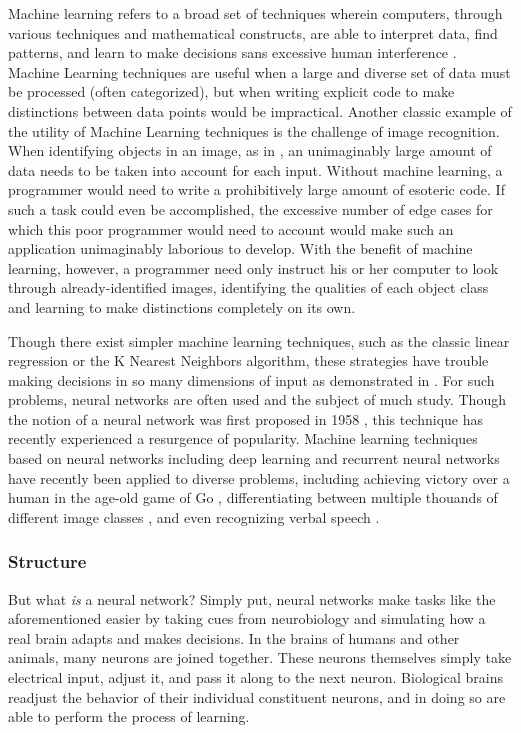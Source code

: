 \documentclass{article}
\begin{document}
Machine learning refers to a broad set of techniques wherein computers, through various techniques and mathematical constructs, are able to interpret data, find patterns, and learn to make decisions sans excessive human interference \cite{sasml}. Machine Learning techniques are useful when a large and diverse set of data must be processed (often categorized), but when writing explicit code to make distinctions between data points would be impractical. Another classic example of the utility of Machine Learning techniques is the challenge of image recognition. When identifying objects in an image, as in \cite{hinton12}, an unimaginably large amount of data needs to be taken into account for each input. Without machine learning, a programmer would need to write a prohibitively large amount of esoteric code. If such a task could even be accomplished, the excessive number of edge cases for which this poor programmer would need to account would make such an application unimaginably laborious to develop. With the benefit of machine learning, however, a programmer need only instruct his or her computer to look through already-identified images, identifying the qualities of each object class and learning to make distinctions completely on its own.

Though there exist simpler machine learning techniques, such as the classic linear regression or the K Nearest Neighbors algorithm, these strategies have trouble making decisions in so many dimensions of input as demonstrated in \cite{knnic}. For such problems, neural networks are often used and the subject of much study. Though the notion of a neural network was first proposed in 1958 \cite{rosenblatt58}, this technique has recently experienced a resurgence of popularity. Machine learning techniques based on neural networks including deep learning \cite{mitdeeplearning} and recurrent neural networks \cite{recurrentsurvey} have recently been applied to diverse problems, including achieving victory over a human in the age-old game of Go \cite{go1}\cite{go2}, differentiating between multiple thouands of different image classes \cite{hinton12}, and even recognizing verbal speech \cite{rnnspoken}.

\subsubsection{Structure}
But what \textit{is} a neural network? Simply put, neural networks make tasks like the aforementioned easier by taking cues from neurobiology and simulating how a real brain adapts and makes decisions. In the brains of humans and other animals, many neurons are joined together. These neurons themselves simply take electrical input, adjust it, and pass it along to the next neuron. Biological brains readjust the behavior of their individual constituent neurons, and in doing so are able to perform the process of learning.
\end{document}
